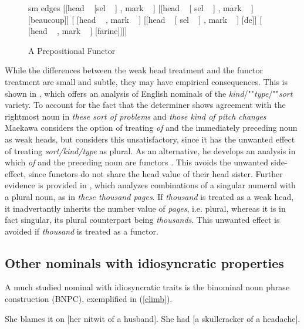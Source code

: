 \documentclass[output=paper]{langsci/langscibook}
\begin{document}
\begin{figure}
	\centering
	\begin{forest}
sm edges
[{[{\sc head} ~  [{\sc sel} ~ ] , {\sc mark} ~  ]}
	[{[{\sc head} ~ [ {\sc sel} ~ ] , {\sc mark} ~ ]} [beaucoup]]
	[{ [{\sc head} ~  , {\sc mark} ~  ]}
		[{[{\sc head} ~ [ {\sc sel} ~ ] , {\sc mark} ~ ]} [de]]
		[{ [{\sc head} ~  , {\sc mark} ~ ]} [farine]]]]
	\end{forest}
	\caption{\label{beau} A Prepositional Functor}
\end{figure}

While the differences between the weak head treatment and the functor treatment are small and subtle, 
they may have empirical consequences. This is shown in \citet{Maekawa15}, which offers 
an analysis of English nominals of the \emph{kind}/""\emph{type}/""\emph{sort} variety.  
To account for the fact that the determiner shows agreement with the 
rightmost noun in \emph{these sort of problems} and \emph{those kind of pitch changes}
Maekawa considers the option of treating \emph{of} and the immediately preceding noun as 
weak heads, but considers this unsatisfactory, since it has the unwanted effect of treating 
\emph{sort/kind/type} as plural. As an alternative, he develops an analysis in which \emph{of} and 
the preceding noun are functors \citep[149]{Maekawa15}. This avoids the unwanted side-effect, 
since functors do not share the {\sc head} value of their head sister. 
Further evidence is provided in \citet{Maekawa16}, which analyzes combinations of a   
singular numeral with a plural noun, as in \emph{these thousand pages}. If 
\emph{thousand} is treated as a weak head, it inadvertantly inherits the number value of
\emph{pages}, i.e. plural, whereas it is in fact singular, its plural counterpart being 
\emph{thousands}. This unwanted effect is avoided if \emph{thousand} is treated as a functor.


\subsection{Other nominals with idiosyncratic properties} 


A much studied nominal with idiosyncratic traits is the binominal noun phrase 
construction (BNPC), exemplified in (\ref{climb}). 

\begin{exe}
\ex\label{climb}
\begin{xlist}
\ex  She blames it on [her nitwit of a husband]. 
\ex  She had [a skullcracker of a headache]. 
\end{xlist}
\end{exe}
\end{document}

